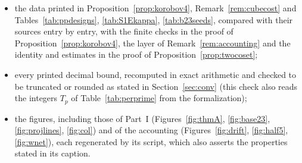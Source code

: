 \documentclass[11pt]{amsart}
\theoremstyle{definition}
\theoremstyle{plain}
\begin{document}
\begin{itemize}
\item the data printed in Proposition~\ref{prop:korobov4}, Remark~\ref{rem:cubecost} and Tables~\ref{tab:ppdesigns}, \ref{tab:S1Ekappa}, \ref{tab:b23seeds}, compared with their sources entry by entry, with the finite checks in the proof of Proposition~\ref{prop:korobov4}, the layer of Remark~\ref{rem:accounting} and the identity and estimates in the proof of Proposition~\ref{prop:twocoset};
\item every printed decimal bound, recomputed in exact arithmetic and checked to be truncated or rounded as stated in Section~\ref{sec:conv} (this check also reads the integers $T_p$ of Table~\ref{tab:perprime} from the formalization);
\item the figures, including those of Part~I (Figures~\ref{fig:thmA}, \ref{fig:base23}, \ref{fig:projlines}, \ref{fig:col}) and of the accounting (Figures~\ref{fig:drift}, \ref{fig:half5}, \ref{fig:wnet}), each regenerated by its script, which also asserts the properties stated in its caption.
\end{itemize}
\end{document}
